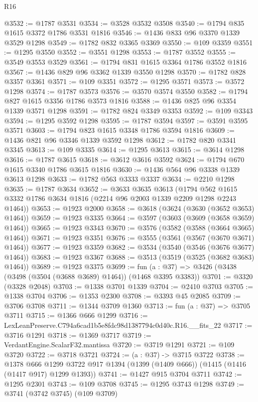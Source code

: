 \begin{lexlean}{R16}
\begin{coremodule}
@3532 := @1787 @3531
@3534 := @3528 @3532 @3508
@3540 := @1794 @835 @1615 @3372 @1786 @3531 @1816
@3546 := @1436 @833 @96 @3370 @1339 @3529 @1298
@3549 := @1782 @832 @3365 @3369
@3550 := @109 @3359
@3551 := @1295 @3550
@3552 := @3551 @1298
@3553 := @1787 @3552
@3555 := @3549 @3553 @3529
@3561 := @1794 @831 @1615 @3364 @1786 @3552 @1816
@3567 := @1436 @829 @96 @3362 @1339 @3550 @1298
@3570 := @1782 @828 @3357 @3361
@3571 := @109 @3351
@3572 := @1295 @3571
@3573 := @3572 @1298
@3574 := @1787 @3573
@3576 := @3570 @3574 @3550
@3582 := @1794 @827 @1615 @3356 @1786 @3573 @1816
@3588 := @1436 @825 @96 @3354 @1339 @3571 @1298
@3591 := @1782 @824 @3349 @3353
@3592 := @109 @3343
@3594 := @1295 @3592 @1298
@3595 := @1787 @3594
@3597 := @3591 @3595 @3571
@3603 := @1794 @823 @1615 @3348 @1786 @3594 @1816
@3609 := @1436 @821 @96 @3346 @1339 @3592 @1298
@3612 := @1782 @820 @3341 @3345
@3613 := @109 @3335
@3614 := @1295 @3613
@3615 := @3614 @1298
@3616 := @1787 @3615
@3618 := @3612 @3616 @3592
@3624 := @1794 @670 @1615 @3340 @1786 @3615 @1816
@3630 := @1436 @564 @96 @3338 @1339 @3613 @1298
@3633 := @1782 @563 @3333 @3337
@3634 := @2210 @1298
@3635 := @1787 @3634
@3652 := @3633
    @3635
    @3613
    (@1794 @562 @1615 @3332 @1786 @3634 @1816 (@2214 @96 @2003 @1339 @2209 @1298 @2243 @1464))
@3653 := @1923 @2000
@3658 := @3618 (@3624 (@3630 (@3652 @3653) @1464))
@3659 := @1923 @3335
@3664 := @3597 (@3603 (@3609 (@3658 @3659) @1464))
@3665 := @1923 @3343
@3670 := @3576 (@3582 (@3588 (@3664 @3665) @1464))
@3671 := @1923 @3351
@3676 := @3555 (@3561 (@3567 (@3670 @3671) @1464))
@3677 := @1923 @3359
@3682 := @3534 (@3540 (@3546 (@3676 @3677) @1464))
@3683 := @1923 @3367
@3688 := @3513 (@3519 (@3525 (@3682 @3683) @1464))
@3689 := @1923 @3375
@3699 := fun (a : @37) => @3426 (@3438 (@3498 (@3504 (@3688 @3689) @1464)) (@1468 @3395 @3383))
@3701 := @3320 (@3328 @2048)
@3703 := @1338 @3701 @1339
@3704 := @2410 @3703
@3705 := @1338 @3704
@3706 := @1353 @2300
@3708 := @3393 @45 @2085
@3709 := @3706 @3708
@3711 := @1344 @3709 @1360
@3713 := fun (a : @37) => @3705 @3711
@3715 := @1366 @666 @1299
@3716 := LexLeanPreserve.C794a6cad1b5e8fdc98d1387794c0d40c.R16.__fits_22
@3717 := @3716 @1291
@3718 := @1369 @3717
@3719 := VerdantEngine.ScalarF32.mantissa
@3720 := @3719 @1291
@3721 := @109 @3720
@3722 := @3718 @3721
@3724 := (a : @37) -> @3715 @3722
@3738 := @1378
    @666
    @1299
    @3722
    @917
    @1394
    (@1399 (@1409 @666))
    (@1415 (@1416 (@1417 @917) @1299 @1393))
@3741 := @1427 @915 @3704 @3711
@3742 := @1295 @2301
@3743 := @109 @3708
@3745 := @1295 @3743 @1298
@3749 := @3741 (@3742 @3745) (@109 @3709)

\end{coremodule}
\end{lexlean}
